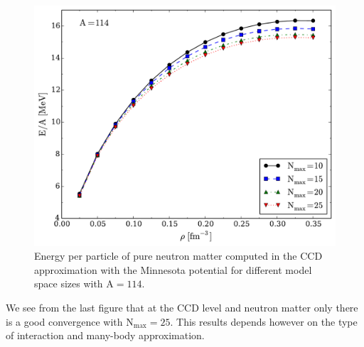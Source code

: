   \begin{figure}
    \includegraphics[width=\linewidth]{Chapter8-figures/fig2.pdf}
    \caption{Energy per particle of pure neutron matter computed in
      the CCD approximation with the Minnesota potential for different
      model space sizes with $\mathrm{A=114}$.}
    \label{fig:fig2}
  \end{figure}
We see from the last figure that at the CCD level and neutron matter only there is a good convergence with  $\mathrm{N_{max}=25}$.
This results depends however on the type of interaction and many-body approximation. 

